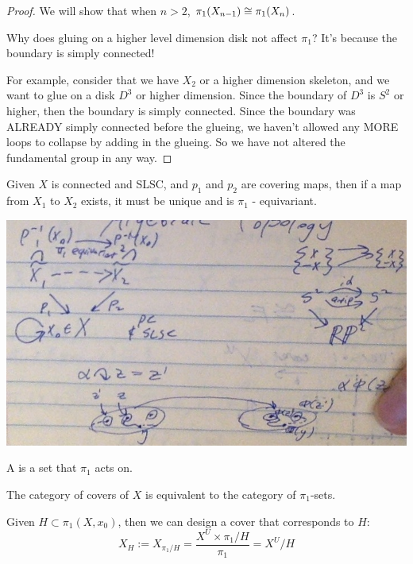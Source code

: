 \documentclass[11pt,leqno,oneside]{amsart}
\newenvironment{dateenv}{
  \vspace{1em}
}{
  \vspace{1em}
}
\newcommand{\mydate}[4]{
  \newdate{#1}{#2}{#3}{#4}
  \begin{dateenv}
    \hfill\displaydate{#1}
  \end{dateenv}
}
\numberwithin{thm}{section}
\newcommand{\fund}[1][1]{\pi_{#1}}
\newcommand{\x}{\times}
\begin{document}
\begin{proof}
  We will show that when $n > 2$, $\fund(X_{n-1}) \isom \fund(X_n)$.

  Why does gluing on a higher level dimension disk not affect $\fund$?  It's because the boundary is simply connected!

  For example, consider that we have $X_2$ or a higher dimension skeleton, and we want to glue on a disk $D^3$ or higher dimension.  Since the boundary of $D^3$ is $S^2$ or higher, then the boundary is simply connected.  Since the boundary was ALREADY simply connected before the glueing, we haven't allowed any MORE loops to collapse by adding in the glueing.  So we have not altered the fundamental group in any way.
\end{proof}



\mydate{d10}{17}{2}{2017}

\begin{thm}
  Given $X$ is connected and SLSC, and $p_1$ and $p_2$ are covering maps, then if a map from $X_1$ to $X_2$ exists, it must be unique and is $\fund$ - equivariant.
\end{thm}

\includegraphics[scale=0.4]{images/fund-equivariant}

\begin{defn}
  A \de{$\fund$-set} is a set that $\fund$ acts on.
\end{defn}
\begin{thm}
  The category of covers of $X$ is equivalent to the category of $\fund$-sets.
\end{thm}

Given $H \subset \fund(X, x_0)$, then we can design a cover that corresponds to $H$:
$$X_H := X_{\fund/H} = \frac{X^U \x \fund/H}{\fund} = X^U/H$$
\end{document}
